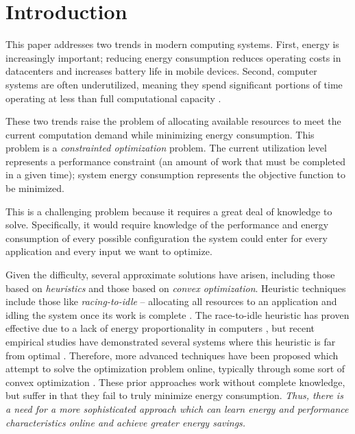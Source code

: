 
\section{Introduction}

This paper addresses two trends in modern computing systems.  First, energy is increasingly important; reducing energy consumption reduces operating costs in datacenters and increases battery life in mobile devices.  Second, computer systems are often underutilized, meaning they spend significant portions of time operating at less than full computational capacity \cite{}.  

These two trends raise the problem of allocating available resources to meet the current computation demand while minimizing energy consumption. This problem is a \emph{constrainted optimization} problem. The current utilization level represents a performance constraint (\ie an amount of work that must be completed in a given time); system energy consumption represents the objective function to be minimized.  

This is a challenging problem because it requires a great deal of knowledge to solve.  Specifically, it would require knowledge of the performance and energy consumption of every possible configuration the system could enter for every application and every input we want to optimize.  

Given the difficulty, several approximate solutions have arisen, including those based on \emph{heuristics} and those based on \emph{convex optimization}.  Heuristic techniques include those like \emph{racing-to-idle} -- allocating all resources to an application and idling the system once its work is complete \cite{}.  The race-to-idle heuristic has proven effective due to a lack of energy proportionality in computers \cite{}, but recent empirical studies have demonstrated several systems where this heuristic is far from optimal \cite{}.  Therefore, more advanced techniques have been proposed which attempt to solve the optimization problem online, typically through some sort of convex optimization \cite{}. These prior approaches work without complete knowledge, but suffer in that they fail to truly minimize energy consumption.  \emph{Thus, there is a need for a more sophisticated approach which can learn energy and performance characteristics online and achieve greater energy savings.}

